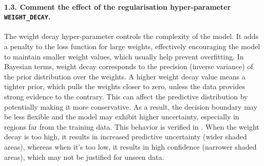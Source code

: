 \paragraph{1.3. Comment the effect of the regularisation hyper-parameter \texttt{WEIGHT\_DECAY}.}

The weight decay hyper-parameter controls the complexity of the model. It adds a penalty to the loss function for large weights, effectively encouraging the model to maintain smaller weight values, which usually help prevent overfitting. In Bayesian terms, weight decay corresponds to the precision (inverse variance) of the prior distribution over the weights. A higher weight decay value means a tighter prior, which pulls the weights closer to zero, unless the data provides strong evidence to the contrary. This can affect the predictive distribution by potentially making it more conservative. As a result, the decision boundary may be less flexible and the model may exhibit higher uncertainty, especially in regions far from the training data. This behavior is verified in . When the weight decay is too high, it results in increased predictive uncertainty (wider shaded areas), whereas when it's too low, it results in high confidence (narrower shaded areas), which may not be justified for unseen data.

